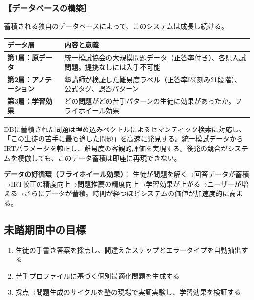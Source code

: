 \documentclass[paper=a4,fontsize=10.5bp,jafontsize=10.5bp,twocolumn]{jlreq}
\begin{document}
\subsubsection{【データベースの構築】}

蓄積される独自のデータベースによって、このシステムは成長し続ける。

\begin{footnotesize}\noindent
\begin{tabularx}{\linewidth}{>{\bfseries}l X}
\toprule
データ層 & 内容と意義 \\
\midrule
第1層：原データ & 統一模試協会の大規模問題データ（正答率付き）、各県入試問題。提携なしには入手不可能 \\
第2層：アノテーション & 塾講師が検証した難易度ラベル（正答率5\%刻み21段階）、公式タグ、誤答パターン \\
第3層：学習効果 & どの問題がどの苦手パターンの生徒に効果があったか。フライホイール効果 \\
\bottomrule
\end{tabularx}
\end{footnotesize}

DBに蓄積された問題は埋め込みベクトルによるセマンティック検索に対応し、「この生徒の苦手に最も適した問題」を高速に発見する。統一模試データからIRTパラメータを較正し、難易度の客観的評価を実現する。後発の競合がシステムを模倣しても、このデータ蓄積は即座に再現できない。

\begin{graybox}
\textbf{データの好循環（フライホイール効果）：}
生徒が問題を解く→回答データが蓄積→IRT較正の精度向上→問題推薦の精度向上→学習効果が上がる→ユーザーが増える→さらにデータが蓄積。時間が経つほどシステムの価値が加速度的に高まる。
\end{graybox}

\subsection{未踏期間中の目標}

\begin{enumerate}[leftmargin=1.5em]
  \item 生徒の手書き答案を採点し、間違えたステップとエラータイプを自動抽出する
  \item 苦手プロファイルに基づく個別最適化問題を生成する
  \item 採点→問題生成のサイクルを塾の現場で実証実験し、学習効果を検証する
\end{enumerate}

\end{document}
